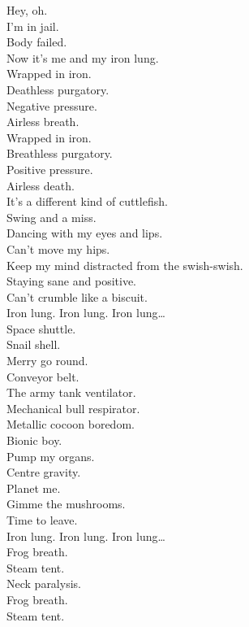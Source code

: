 

Hey, oh. \\
I'm in jail. \\
Body failed. \\
Now it's me and my iron lung. \\
Wrapped in iron. \\
Deathless purgatory. \\
Negative pressure. \\
Airless breath. \\
Wrapped in iron. \\
Breathless purgatory. \\
Positive pressure. \\
Airless death. \\

It's a different kind of cuttlefish. \\
Swing and a miss. \\
Dancing with my eyes and lips. \\
Can't move my hips. \\
Keep my mind distracted from the swish-swish. \\
Staying sane and positive. \\
Can't crumble like a biscuit. \\

Iron lung. Iron lung. Iron lung… \\

Space shuttle. \\
Snail shell. \\
Merry go round. \\
Conveyor belt. \\
The army tank ventilator. \\
Mechanical bull respirator. \\
Metallic cocoon boredom. \\
Bionic boy. \\
Pump my organs. \\
Centre gravity. \\
Planet me. \\
Gimme the mushrooms. \\
Time to leave. \\

Iron lung. Iron lung. Iron lung… \\

Frog breath. \\
Steam tent. \\
Neck paralysis. \\
Frog breath. \\
Steam tent. \\

